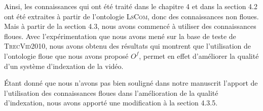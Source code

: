 \documentclass[11pt]{article}
\begin{document}
      Ainsi, les connaissances qui ont été traité dans le chapitre 4 et dans la section 4.2 
      ont été extraites à partir de l’ontologie \textsc{LsCom}, donc des connaissances non floues. 
      Mais à partir de la section 4.3, nous avons commencé à utiliser des connaissances floues. 
      Avec l’expérimentation que nous avons mené sur la base de teste de \textsc{TrecVid2010}, 
      nous avons obtenu des résultats qui montrent que l’utilisation de l’ontologie floue que 
      nous avons proposé $O^{f}$, permet en effet d’améliorer la qualité d’un système 
      d’indexation de la vidéo.
      
      Étant donné que nous n’avons pas bien souligné dans notre manuscrit l’apport de 
      l’utilisation des connaissances floues dans l’amélioration de la qualité d’indexation,
      nous avons apporté une modification à la section 4.3.5.


 
\newpage


\end{document}
